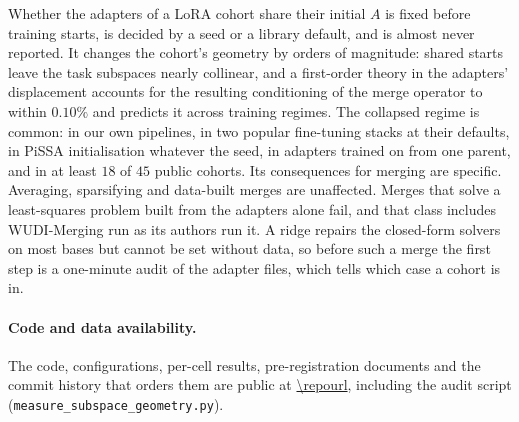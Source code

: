 Whether the adapters of a LoRA cohort share their initial $A$ is fixed before
training starts, is decided by a seed or a library default, and is almost never
reported. It changes the cohort's geometry by orders of magnitude: shared
starts leave the task subspaces nearly collinear, and a first-order theory in
the adapters' displacement accounts for the resulting conditioning of the
merge operator to within $0.10\%$ and predicts it across training regimes. The
collapsed regime is common: in our own pipelines, in two popular fine-tuning
stacks at their defaults, in PiSSA initialisation whatever the seed, in
adapters trained on from one parent, and in at least $18$ of $45$ public cohorts. Its
consequences for merging are specific. Averaging, sparsifying and data-built
merges are unaffected. Merges that solve a least-squares problem built from
the adapters alone fail, and that class includes WUDI-Merging run as its
authors run it. A ridge repairs the closed-form solvers on most bases but
cannot be set without data, so before such a merge the first step is a
one-minute audit of the adapter files, which tells which case a cohort is in.

\paragraph{Code and data availability.} The code, configurations, per-cell
results, pre-registration documents and the commit history that orders them
are public at \url{\repourl}, including the audit script
(\texttt{measure\_\allowbreak subspace\_\allowbreak geometry.py}).
